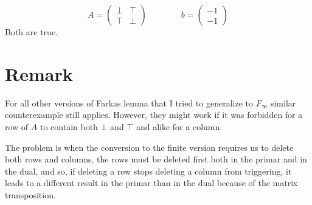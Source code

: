 \documentclass[]{article}
\begin{document}
$$
A =
\begin{pmatrix}
	\bot & \top\\
	\top & \bot
\end{pmatrix}
\qquad \qquad
b =
\begin{pmatrix}
	-1 \\
	-1
\end{pmatrix}
$$
Both are true.

\section{Remark}

For all other versions of Farkas lemma
that I tried to generalize to $F_\infty$
similar counterexample still applies.
However, they might work if it was forbidden
for a row of $A$ to contain both $\bot$ and $\top$
and alike for a column.

The problem is when the conversion to the finite
version requires us to delete both rows and columns,
the rows must be deleted first both in the primar
and in the dual, and so, if deleting a row stops
deleting a column from triggering, it leads to a
different result in the primar than in the dual
because of the matrix transposition.
\end{document}
